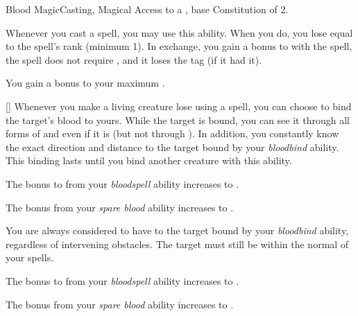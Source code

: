     \begin{feat}{Blood Magic}{Casting, Magical}
        \featpre Access to a , base Constitution of 2.

         Whenever you cast a spell, you may use this ability.
        When you do, you lose  equal to the spell's rank (minimum 1).
        In exchange, you gain a  bonus to  with the spell, the spell does not require , and it loses the  tag (if it had it).

         You gain a  bonus to your maximum .

        [] Whenever you make a living creature lose  using a spell, you can choose to bind the target's blood to yours.
        While the target is bound, you can see it through all forms of  and even if it is  (but not through ).
        In addition, you constantly know the exact direction and distance to the target bound by your \textit{bloodbind} ability.
        This binding lasts until you bind another creature with this ability.

         The bonus to  from your \textit{bloodspell} ability increases to .

         The bonus from your \textit{spare blood} ability increases to .

         You are always considered to have  to the target bound by your \textit{bloodbind} ability, regardless of intervening obstacles.
        The target must still be within the normal  of your spells.

         The bonus to  from your \textit{bloodspell} ability increases to .

         The bonus from your \textit{spare blood} ability increases to .
    \end{feat}

